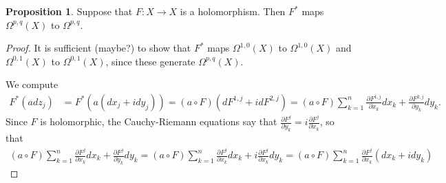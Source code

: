 \documentclass[12pt]{article}
\theoremstyle{definition}
\newtheorem{prop}{Proposition}[section]
\begin{document}
\begin{prop}
	Suppose that $F:X\to X$ is a holomorphism. Then $F^*$ maps $\Omega^{p,q}(X)$ to $\Omega^{p,q}$.
\end{prop}
\begin{proof}
	It is sufficient (maybe?) to show that $F^*$ maps $\Omega^{1,0}(X)$ to $\Omega^{1,0}(X)$ and $\Omega^{0,1}(X)$ to $\Omega^{0,1}(X)$, since these generate $\Omega^{p,q}(X)$. 
	
	We compute  
		\begin{align*}
			F^*(adz_j) & = F^*(a(dx_j+idy_j)) = (a\circ F)(dF^{1,j}+idF^{2,j}) = (a\circ F)\sum_{k=1}^n\frac{\partial F^{1,j}}{\partial x_k}dx_k +\frac{\partial F^{2,j}}{\partial y_k}dy_k.
		\end{align*}
	Since $F$ is holomorphic, the Cauchy-Riemann equations say that $\frac{\partial F^j}{\partial y_k} = i\frac{\partial F^j}{\partial x_k}$, so that 
		\begin{align*}
			(a\circ F)\sum_{k=1}^n\frac{\partial F^j}{\partial x_k}dx_k +\frac{\partial F^j}{\partial y_k}dy_k = (a\circ F)\sum_{k=1}^n\frac{\partial F^j}{\partial x_k}dx_k +i\frac{\partial F^j}{\partial x_k}dy_k = (a\circ F)\sum_{k=1}^n\frac{\partial F^j}{\partial x_k}(dx_k +idy_k)
		\end{align*}
\end{proof}
\end{document}
